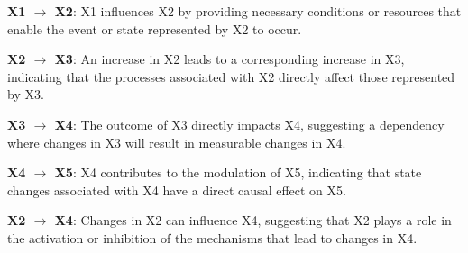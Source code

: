 \documentclass{article}
\begin{document}
\begin{minipage}[t]{0.7\linewidth}
\textbf{X1 $\rightarrow$ X2}: X1 influences X2 by providing necessary conditions or resources that enable the event or state represented by X2 to occur.

\textbf{X2 $\rightarrow$ X3}: An increase in X2 leads to a corresponding increase in X3, indicating that the processes associated with X2 directly affect those represented by X3.

\textbf{X3 $\rightarrow$ X4}: The outcome of X3 directly impacts X4, suggesting a dependency where changes in X3 will result in measurable changes in X4.

\textbf{X4 $\rightarrow$ X5}: X4 contributes to the modulation of X5, indicating that state changes associated with X4 have a direct causal effect on X5.

\textbf{X2 $\rightarrow$ X4}: Changes in X2 can influence X4, suggesting that X2 plays a role in the activation or inhibition of the mechanisms that lead to changes in X4.
\end{minipage}
\hspace{0.05\textwidth}
\end{document}
